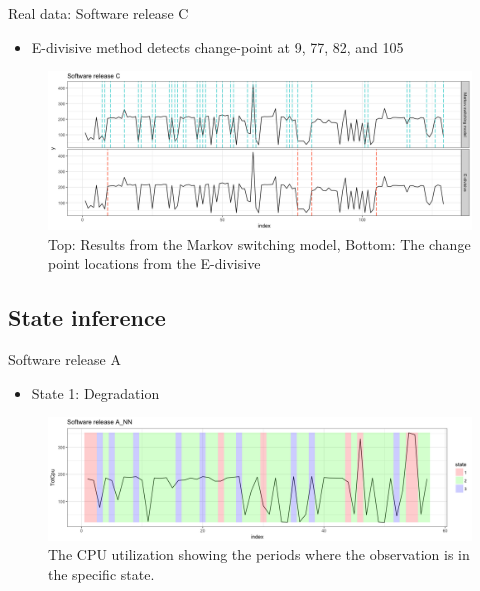 \documentclass{beamer}
\begin{document}
\begin{frame}
Real data: Software release C

\begin{itemize}
\item E-divisive method detects change-point at 9, 77, 82, and 105
\end{itemize}

\begin{figure}
\includegraphics[width=1\linewidth]{compare_L17A}
\caption{Top: Results from the Markov switching model, Bottom: The change point locations from the E-divisive}
\end{figure}
\end{frame}

\subsection{State inference}
\begin{frame}
Software release A
\pause

\begin{itemize}
\item State 1: Degradation
\end{itemize}

\begin{figure}
\includegraphics[width=1\linewidth]{L16A_NN1}
\caption{The CPU utilization showing the periods where the observation is in the specific state.}
\end{figure}

\end{frame}
\end{document}
